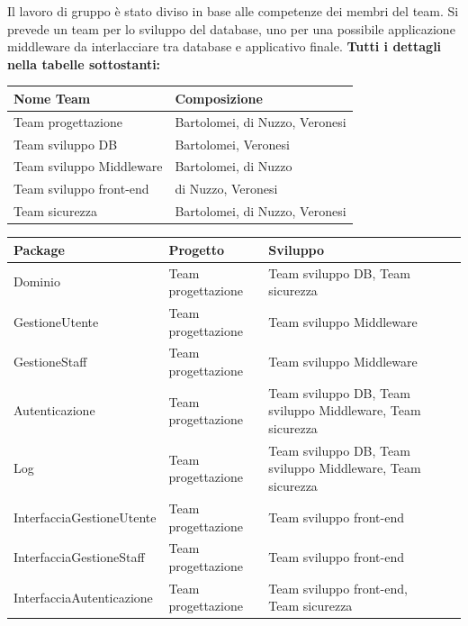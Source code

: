 \documentclass[a4paper]{article}
\begin{document}
Il lavoro di gruppo è stato diviso in base alle competenze dei membri del team. Si prevede un team per lo sviluppo del database, uno per una possibile applicazione middleware da interlacciare tra database e applicativo finale. \textbf{Tutti i dettagli nella tabelle sottostanti:}

\begin{center}
    \begin{tabularx}{1\textwidth}{|X|X|}
        \hline
        \textbf{Nome Team} & \textbf{Composizione}\\
        \hline
        \hline
        Team progettazione & Bartolomei, di Nuzzo, Veronesi\\
        \hline
        Team sviluppo DB & Bartolomei, Veronesi\\
        \hline
        Team sviluppo Middleware & Bartolomei, di Nuzzo\\
        \hline
        Team sviluppo front-end & di Nuzzo, Veronesi\\
        \hline
        Team sicurezza & Bartolomei, di Nuzzo, Veronesi\\
        \hline
    \end{tabularx}
\end{center}

\begin{center}
    \begin{tabularx}{1\textwidth}{|X|X|X|X|}
    \hline
    \textbf{Package} & \textbf{Progetto} & \textbf{Sviluppo}\\
    \hline
    \hline
    Dominio & Team progettazione & Team sviluppo DB, Team sicurezza  \\
    \hline
    GestioneUtente & Team progettazione & Team sviluppo Middleware\\
    \hline
    GestioneStaff & Team progettazione & Team sviluppo Middleware\\
    \hline
    Autenticazione & Team progettazione & Team sviluppo DB, Team sviluppo Middleware, Team sicurezza\\
    \hline
    Log & Team progettazione & Team sviluppo DB, Team sviluppo Middleware, Team sicurezza\\
    \hline
    InterfacciaGestioneUtente & Team progettazione & Team sviluppo front-end \\
    \hline
    InterfacciaGestioneStaff & Team progettazione & Team sviluppo front-end\\
    \hline
    InterfacciaAutenticazione & Team progettazione & Team sviluppo front-end, Team sicurezza\\
    \hline
    \end{tabularx}
\end{center}
\end{document}
